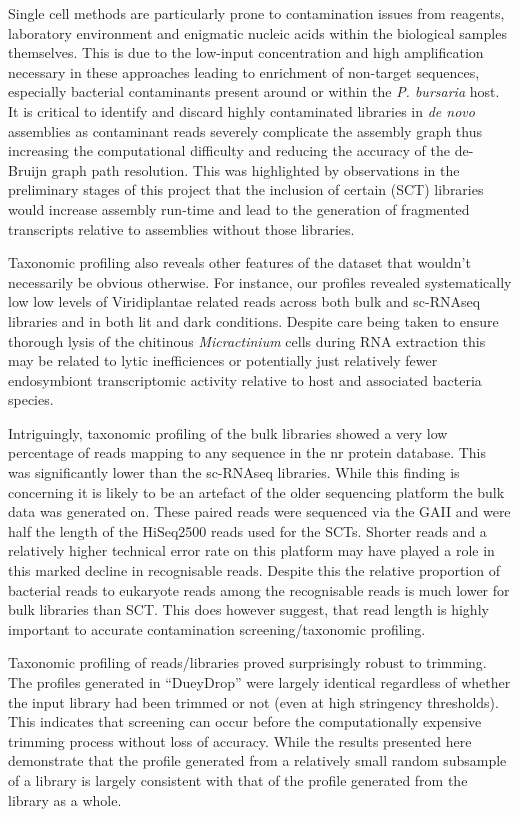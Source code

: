 Single cell methods are particularly prone to contamination issues
from reagents, laboratory environment and enigmatic nucleic acids within the biological samples themselves.
This is due to the low-input concentration and high amplification necessary in these approaches \citep{Blainey2013} 
leading to enrichment of non-target sequences, especially bacterial contaminants present around or within the
\textit{P. bursaria} host.  
It is critical to identify and discard highly contaminated libraries in \textit{de novo} assemblies as contaminant
reads severely complicate the assembly graph thus increasing the computational difficulty and reducing the accuracy
of the de-Bruijn graph path resolution.  This was highlighted by observations in the preliminary 
stages of this project that the inclusion of certain (SCT) libraries would increase
assembly run-time and lead to the generation of fragmented transcripts relative to assemblies without those
libraries.  

Taxonomic profiling also reveals other features of the dataset that wouldn't necessarily be
obvious otherwise.  For instance, our profiles revealed systematically low 
low levels of Viridiplantae related reads across both bulk and sc-RNAseq libraries and in both lit and dark conditions.  
Despite care being taken to ensure thorough lysis of the chitinous \textit{Micractinium} cells during 
RNA extraction this may be related to lytic inefficiences \citep{Korfhage2015} or potentially
just relatively fewer endosymbiont transcriptomic activity relative to host and associated bacteria species.

Intriguingly, taxonomic profiling of the bulk libraries showed a very low percentage of reads 
mapping to any sequence in the nr protein database.  This was significantly lower than the
sc-RNAseq libraries.  While this finding is concerning it is likely to be an artefact of the older 
sequencing platform the bulk data was generated on.
These paired reads were sequenced via the GAII and were half the length of the HiSeq2500 reads used for 
the SCTs.  Shorter reads and a relatively higher
technical error rate on this platform may have played a role in this marked decline in recognisable reads. 
Despite this the relative proportion of bacterial reads to eukaryote reads among the 
recognisable reads is much lower for bulk libraries than SCT.  This does however suggest, that
read length is highly important to accurate contamination screening/taxonomic profiling.

Taxonomic profiling of reads/libraries proved surprisingly robust to trimming.  The profiles
generated in ``DueyDrop'' were largely identical regardless of whether the input library 
had been trimmed or not (even at high stringency thresholds).  This indicates that
screening can occur before the computationally expensive trimming process without loss
of accuracy.   
While the results presented here demonstrate that the profile
generated from a relatively small random subsample of a library is largely consistent 
with that of the profile generated from the library as a whole.
 
